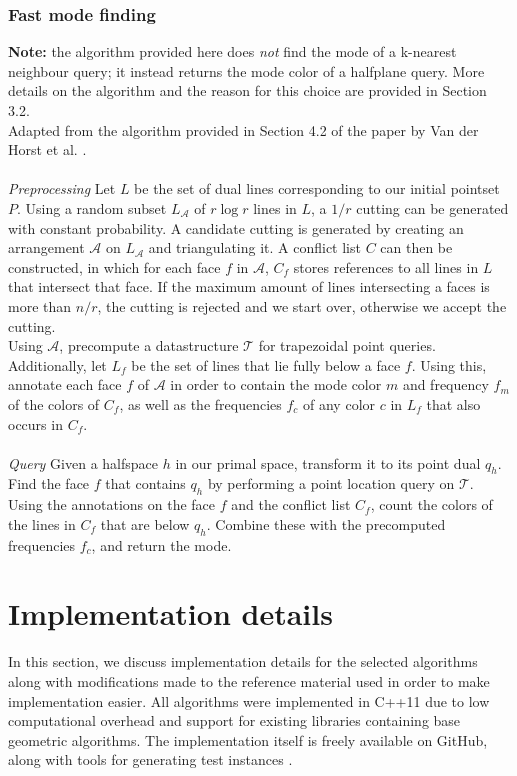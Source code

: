 \documentclass{article}
\begin{document}
\subsubsection{Fast mode finding}
\textbf{Note: } the algorithm provided here does \textit{not} find the mode of a k-nearest neighbour query; it instead returns the mode color of a halfplane query. More details on the algorithm and the reason for this choice are provided in Section 3.2. \\
Adapted from the algorithm provided in Section 4.2 of the paper by Van der Horst et al. \cite{vanderhorst_et_al:LIPIcs.ESA.2022.67}. \\\\
\textit{Preprocessing} Let $L$ be the set of dual lines corresponding to our initial pointset $P$. Using a random subset $L_{\mathcal{A}}$ of $r \log r$ lines in $L$, a $1/r$ cutting can be generated with constant probability. A candidate cutting is generated by creating an arrangement $\mathcal{A}$ on $L_{\mathcal{A}}$ and triangulating it. A conflict list $C$ can then be constructed, in which for each face $f$ in $\mathcal{A}$, $C_f$ stores references to all lines in $L$ that intersect that face. If the maximum amount of lines intersecting a faces is more than $n/r$, the cutting is rejected and we start over, otherwise we accept the cutting. \\
Using $\mathcal{A}$, precompute a datastructure $\mathcal{T}$ for trapezoidal point queries. Additionally, let $L_f$ be the set of lines that lie fully below a face $f$. Using this, annotate each face $f$ of $\mathcal{A}$ in order to contain the mode color $m$ and frequency $f_m$ of the colors of $C_f$, as well as the frequencies $f_c$ of any color $c$ in $L_f$ that also occurs in $C_f$.\\\\
\textit{Query} Given a halfspace $h$ in our primal space, transform it to its point dual $q_h$. Find the face $f$ that contains $q_h$ by performing a point location query on $\mathcal{T}$. Using the annotations on the face $f$ and the conflict list $C_f$, count the colors of the lines in $C_f$ that are below $q_h$. Combine these with the precomputed frequencies $f_c$, and return the mode.
\section{Implementation details}
In this section, we discuss implementation details for the selected algorithms
along with modifications made to the reference material used in order to make
implementation easier. All algorithms were implemented in C++11 due to low
computational overhead and support for existing libraries containing base
geometric algorithms. The implementation itself is freely available on GitHub,
along with tools for generating test instances \cite{vanderPlasImplementation}.
\end{document}
